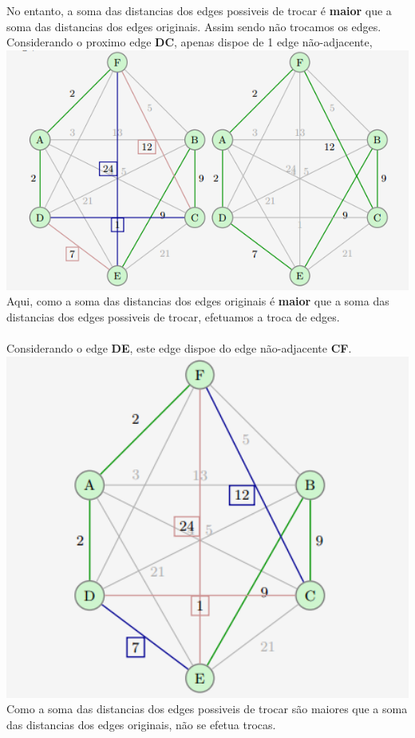 \documentclass[12pt,a4paper,portrait]{article}
\begin{document}
			No entanto, a soma das distancias dos edges possiveis de trocar é \textbf{maior} que a soma das distancias dos edges originais. Assim sendo não trocamos os edges.\\
			\newpage
			Considerando o proximo edge \textbf{DC}, apenas dispoe de 1 edge não-adjacente,
			\includegraphics[width=1.0\textwidth]{imagens/3}
			Aqui, como a soma das distancias dos edges originais é \textbf{maior} que a soma das distancias dos edges possiveis de trocar, efetuamos a troca de edges.\\\\
			\newpage
			Considerando o edge \textbf{DE}, este edge dispoe do edge não-adjacente \textbf{CF}.\\
			\includegraphics[width=1.0\textwidth]{imagens/4}
			Como a soma das distancias dos edges possiveis de trocar são maiores que a soma das distancias dos edges originais, não se efetua trocas.\\\\
\end{document}
